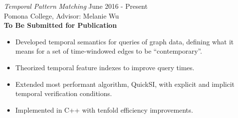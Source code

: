 {\sl Temporal Pattern Matching} \hfill June 2016 - Present \\
Pomona College, Advisor: Melanie Wu \\
\textbf{To Be Submitted for Publication}
\begin{itemize} \itemsep -2pt
  \item Developed temporal semantics for queries of graph data, defining what it
  means for a set of time-windowed edges to be ``contemporary''.
  \item Theorized temporal feature indexes to improve query times.
  \item Extended most performant algorithm, QuickSI, with explicit and implicit
  temporal verification  conditions.

  \item Implemented in C++ with tenfold efficiency improvements.
\end{itemize}
